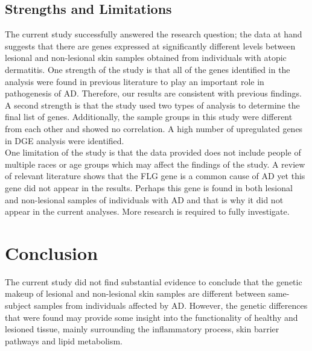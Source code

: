 \documentclass[journal, a4paper]{IEEEtran}
\begin{document}
\subsection{Strengths and Limitations}

The current study successfully answered the research question; the data at hand suggests that there are genes expressed at significantly different levels between lesional and non-lesional skin samples obtained from individuals with atopic dermatitis. One strength of the study is that all of the genes identified in the analysis were found in previous literature to play an important role in pathogenesis of AD. Therefore, our results are consistent with previous findings.\\

A second strength is that the study used two types of analysis to determine the final list of genes. Additionally, the sample groups in this study were different from each other and showed no correlation. A high number of upregulated genes in DGE analysis were identified.\\

One limitation of the study is that the data provided does not include people of multiple races or age groups which may affect the findings of the study. A review of relevant literature shows that the FLG gene is a common cause of AD yet this gene did not appear in the results. Perhaps this gene is found in both lesional and non-lesional samples of individuals with AD and that is why it did not appear in the current analyses. More research is required to fully investigate.\\



\section{Conclusion}

The current study did not find substantial evidence to conclude that the genetic makeup of lesional and non-lesional skin samples are different between same-subject samples from individuals affected by AD. However, the genetic differences that were found may provide some insight into the functionality of healthy and lesioned tissue, mainly surrounding the inflammatory process, skin barrier pathways and lipid metabolism.\\
\end{document}
